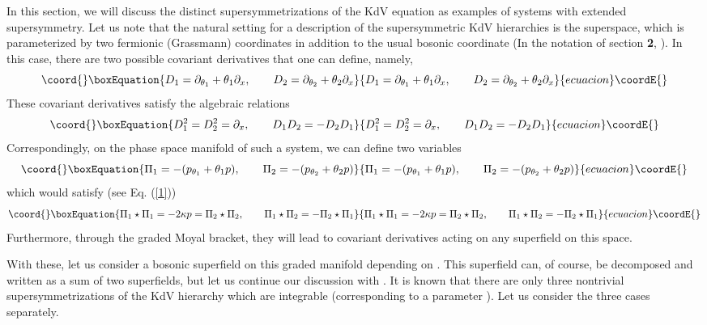 \documentclass[a4paper,11pt]{article}
\begin{document}
In this section, we will discuss the distinct \coordHE{}
supersymmetrizations of the KdV equation as examples of systems with
extended supersymmetry. Let us note that the natural setting for a
description of the \coordHE{} supersymmetric KdV
hierarchies is the \coordHE{} superspace, which is parameterized by two
fermionic (Grassmann) coordinates \coordHE{} in addition
to the usual bosonic coordinate \coordHE{} (In the notation of section {\bf
2}, \coordHE{}). In this case, there are two
possible covariant derivatives that one can define, namely,
\begin{equation}\coord{}\boxEquation{
D_{1} = \partial_{\theta_{1}} + \theta_{1} \partial_{x},\qquad D_{2} =
\partial_{\theta_{2}} + \theta_{2} \partial_{x}
}{
D_{1} = \partial_{\theta_{1}} + \theta_{1} \partial_{x},\qquad D_{2} =
\partial_{\theta_{2}} + \theta_{2} \partial_{x}
}{ecuacion}\coordE{}\end{equation}
These covariant derivatives satisfy the algebraic relations
\begin{equation}\coord{}\boxEquation{
D_{1}^{2} = D_{2}^{2} = \partial_{x},\qquad D_{1}D_{2} = - D_{2}D_{1}
}{
D_{1}^{2} = D_{2}^{2} = \partial_{x},\qquad D_{1}D_{2} = - D_{2}D_{1}
}{ecuacion}\coordE{}\end{equation}
Correspondingly, on the phase space manifold of such a system, we can
define two variables
\begin{equation}\coord{}\boxEquation{
\Pi_{1} = - (p_{\theta_{1}} + \theta_{1} p),\qquad \Pi_{2} = -
(p_{\theta_{2}} + \theta_{2} p)
}{
\Pi_{1} = - (p_{\theta_{1}} + \theta_{1} p),\qquad \Pi_{2} = -
(p_{\theta_{2}} + \theta_{2} p)
}{ecuacion}\coordE{}\end{equation}
which would satisfy (see Eq. (\ref{1}))
\begin{equation}\coord{}\boxEquation{
\Pi_{1}\star \Pi_{1} = - 2\kappa p = \Pi_{2}\star \Pi_{2},\qquad
\Pi_{1}\star \Pi_{2} = - \Pi_{2}\star \Pi_{1}
}{
\Pi_{1}\star \Pi_{1} = - 2\kappa p = \Pi_{2}\star \Pi_{2},\qquad
\Pi_{1}\star \Pi_{2} = - \Pi_{2}\star \Pi_{1}
}{ecuacion}\coordE{}\end{equation}
Furthermore, through the graded Moyal bracket, they will lead to
covariant derivatives acting on any superfield on this space.

With these, let us consider a bosonic superfield \myHighlight{$\Psi$}\coordHE{} on this graded
manifold depending on \coordHE{}. This \coordHE{} superfield can,
of course, be decomposed and written as a sum of two \coordHE{}
superfields, but let us continue our discussion with \myHighlight{$\Psi$}\coordHE{}. It is
known that there are only three nontrivial \coordHE{} supersymmetrizations of
the KdV hierarchy which are integrable (corresponding to a parameter
\coordHE{}). Let us consider the three cases separately. 
\end{document}
